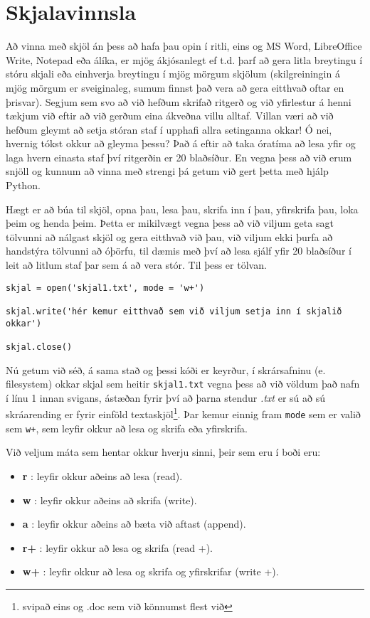 
\chapter{Skjalavinnsla}\label{k:skjalavinnsla}
Að vinna með skjöl án þess að hafa þau opin í ritli, eins og MS Word, LibreOffice Write, Notepad eða álíka, er mjög ákjósanlegt ef t.d. þarf að gera litla breytingu í stóru skjali eða einhverja breytingu í mjög mörgum skjölum (skilgreiningin á mjög mörgum er sveiginaleg, sumum finnst það vera að gera eitthvað oftar en þrisvar).
Segjum sem svo að við hefðum skrifað ritgerð og við yfirlestur á henni tækjum við eftir að við gerðum eina ákveðna villu alltaf.
Villan væri að við hefðum gleymt að setja stóran staf í upphafi allra setinganna okkar!
Ó nei, hvernig tókst okkur að gleyma þessu?
Það á eftir að taka óratíma að lesa yfir og laga hvern einasta staf því ritgerðin er 20 blaðsíður.
En vegna þess að við erum snjöll og kunnum að vinna með strengi þá getum við gert þetta með hjálp Python.

Hægt er að búa til skjöl, opna þau, lesa þau, skrifa inn í þau, yfirskrifa þau, loka þeim og henda þeim.
Þetta er mikilvægt vegna þess að við viljum geta sagt tölvunni að nálgast skjöl og gera eitthvað við þau, við viljum ekki þurfa að handstýra tölvunni að óþörfu, til dæmis með því að lesa sjálf yfir 20 blaðsíður í leit að litlum staf þar sem á að vera stór.
Til þess er tölvan.

\begin{lstlisting}[caption=Hér sjáum við hvernig má búa til skjöl, label=lst:skjalavinnsla-kynning]
skjal = open('skjal1.txt', mode = 'w+') 

skjal.write('hér kemur eitthvað sem við viljum setja inn í skjalið okkar')

skjal.close()
\end{lstlisting}
\vspace{0.3cm}
Nú getum við séð, á sama stað og þessi kóði er keyrður, í skrársafninu (e. filesystem) okkar skjal sem heitir \texttt{skjal1.txt} vegna þess að við völdum það nafn í línu 1 innan svigans, ástæðan fyrir því að þarna stendur \emph{.txt} er sú að sú skráarending er fyrir einföld textaskjöl\footnote{svipað eins og .doc sem við könnumst flest við}.
Þar kemur einnig fram \texttt{mode} sem er valið sem \texttt{w+}, sem leyfir okkur að lesa og skrifa eða yfirskrifa.
\newpage

Við veljum máta sem hentar okkur hverju sinni, þeir sem eru í boði eru:
\begin{itemize}
	\item \textbf{r} : leyfir okkur aðeins að lesa (read).
	\item \textbf{w} : leyfir okkur aðeins að skrifa (write).
	\item \textbf{a} : leyfir okkur aðeins að bæta við aftast (append).
	\item \textbf{r+} : leyfir okkur að lesa og skrifa (read +).
	\item \textbf{w+} : leyfir okkur að lesa og skrifa og yfirskrifar (write +).
\end{itemize}

